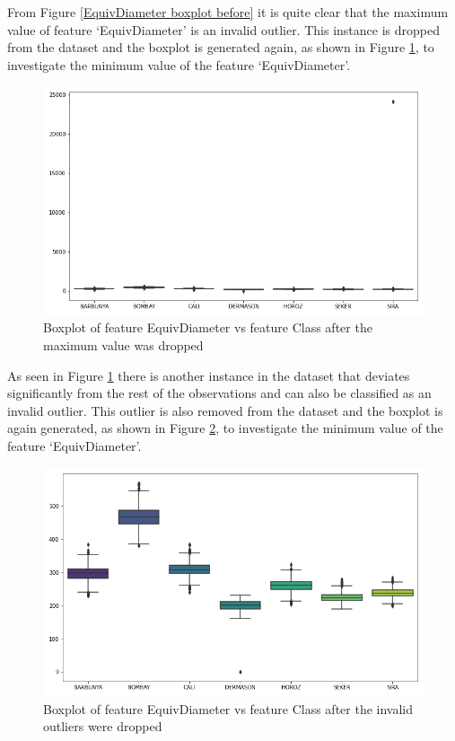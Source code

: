 \documentclass[10pt, conference]{IEEEtran}
\begin{document}
From Figure \ref{EquivDiameter boxplot before} it is quite clear that the maximum value of feature `EquivDiameter'
is an invalid outlier. This instance is dropped from the dataset and the boxplot is generated again, as shown
in Figure \ref{EquivDiameter boxplot before 2}, to investigate the minimum value of the feature `EquivDiameter'.
\begin{figure}[h!]
    \centerline{\includegraphics[scale=0.35]{../Plots/EquivDiameter outlier boxplot 2.png}}
    \caption{Boxplot of feature EquivDiameter vs feature Class after the maximum value was dropped}
    \label{EquivDiameter boxplot before 2}
\end{figure}

As seen in Figure \ref{EquivDiameter boxplot before 2} there is another instance in the dataset that deviates
significantly from the rest of the observations and can also be classified as an invalid outlier. This outlier
is also removed from the dataset and the boxplot is again generated, as shown in Figure
\ref{EquivDiameter boxplot before 3}, to investigate the minimum value of the feature `EquivDiameter'.
\begin{figure}[H]
    \centerline{\includegraphics[scale=0.35]{../Plots/EquivDiameter outlier boxplot 3.png}}
    \caption{Boxplot of feature EquivDiameter vs feature Class after the invalid outliers were dropped}
    \label{EquivDiameter boxplot before 3}
\end{figure}
\end{document}
